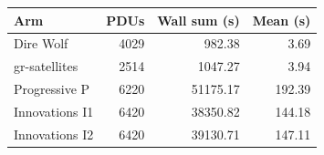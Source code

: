 \begin{tabular}{lrrr}
\toprule Arm & PDUs & Wall sum (s) & Mean (s)\\
\midrule
Dire Wolf & 4029 & 982.38 & 3.69\\
gr-satellites & 2514 & 1047.27 & 3.94\\
Progressive P & 6220 & 51175.17 & 192.39\\
Innovations I1 & 6420 & 38350.82 & 144.18\\
Innovations I2 & 6420 & 39130.71 & 147.11\\
\bottomrule
\end{tabular}
